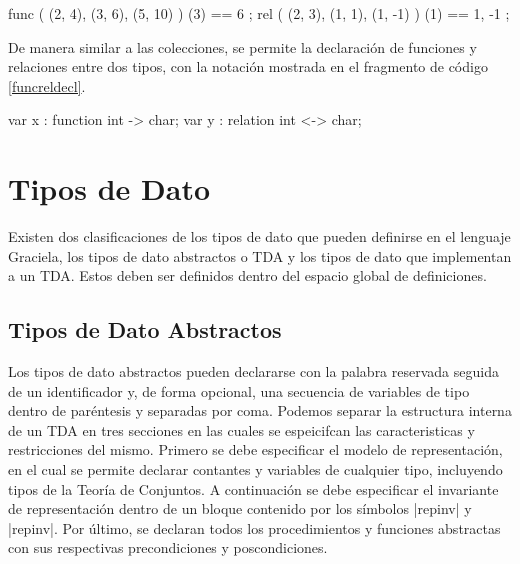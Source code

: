 \begin{gracielacode}[caption=Evaluación de \textit{función} y \textit{relación}, label=lst:funcreleval]
{ func ({ (2, 4), (3, 6), (5, 10) }) (3) == 6 };
{ rel  ({ (2, 3), (1, 1), (1, -1) }) (1) == {1, -1} };
\end{gracielacode}

De manera similar a las colecciones, se permite la declaración de funciones y
relaciones entre dos tipos, con la notación mostrada en el fragmento de código
\ref{funcreldecl}.

\begin{gracielacode}[caption=Declaración de variables de tipos \textit{función} y \textit{relación}, label=lst:funcreldecl]
var x : function int -> char;
var y : relation int <-> char;
\end{gracielacode}

\section{Tipos de Dato}

Existen dos clasificaciones de los tipos de dato que pueden definirse en el
lenguaje Graciela, los tipos de dato abstractos o TDA y los tipos de dato que
implementan a un TDA. Estos deben ser definidos dentro del espacio global de
definiciones.

\subsection{Tipos de Dato Abstractos}

Los tipos de dato abstractos pueden declararse con la palabra reservada
 seguida de un identificador y, de forma opcional, una secuencia
de variables de tipo dentro de paréntesis y separadas por coma. Podemos separar
la estructura interna de un TDA en tres secciones en las cuales se espeicifcan
las caracteristicas y restricciones del mismo. Primero se debe especificar el
modelo de representación, en el cual se permite declarar contantes y variables
de cualquier tipo, incluyendo tipos de la Teoría de Conjuntos. A continuación se
debe especificar el invariante de representación dentro de un bloque contenido
por los símbolos \ingra|{repinv| y \ingra|repinv}|. Por último, se declaran
todos los procedimientos y funciones abstractas con sus respectivas
precondiciones y poscondiciones.

